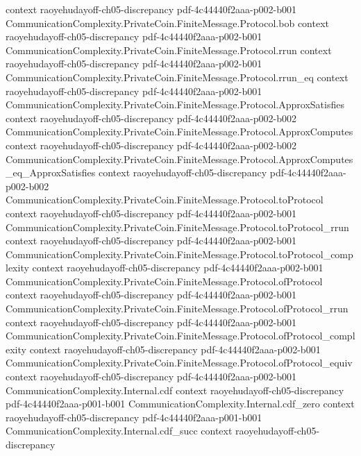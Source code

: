 \begin{theorem}
  {context}
  {raoyehudayoff-ch05-discrepancy}
  {pdf-4c44440f2aaa-p002-b001}
\proofstep
  {CommunicationComplexity.PrivateCoin.FiniteMessage.Protocol.bob}
  {context}
  {raoyehudayoff-ch05-discrepancy}
  {pdf-4c44440f2aaa-p002-b001}
\proofstep
  {CommunicationComplexity.PrivateCoin.FiniteMessage.Protocol.rrun}
  {context}
  {raoyehudayoff-ch05-discrepancy}
  {pdf-4c44440f2aaa-p002-b001}
\proofstep
  {CommunicationComplexity.PrivateCoin.FiniteMessage.Protocol.rrun_eq}
  {context}
  {raoyehudayoff-ch05-discrepancy}
  {pdf-4c44440f2aaa-p002-b001}
\proofstep
  {CommunicationComplexity.PrivateCoin.FiniteMessage.Protocol.ApproxSatisfies}
  {context}
  {raoyehudayoff-ch05-discrepancy}
  {pdf-4c44440f2aaa-p002-b002}
\proofstep
  {CommunicationComplexity.PrivateCoin.FiniteMessage.Protocol.ApproxComputes}
  {context}
  {raoyehudayoff-ch05-discrepancy}
  {pdf-4c44440f2aaa-p002-b002}
\proofstep
  {CommunicationComplexity.PrivateCoin.FiniteMessage.Protocol.ApproxComputes_eq_ApproxSatisfies}
  {context}
  {raoyehudayoff-ch05-discrepancy}
  {pdf-4c44440f2aaa-p002-b002}
\proofstep
  {CommunicationComplexity.PrivateCoin.FiniteMessage.Protocol.toProtocol}
  {context}
  {raoyehudayoff-ch05-discrepancy}
  {pdf-4c44440f2aaa-p002-b001}
\proofstep
  {CommunicationComplexity.PrivateCoin.FiniteMessage.Protocol.toProtocol_rrun}
  {context}
  {raoyehudayoff-ch05-discrepancy}
  {pdf-4c44440f2aaa-p002-b001}
\proofstep
  {CommunicationComplexity.PrivateCoin.FiniteMessage.Protocol.toProtocol_complexity}
  {context}
  {raoyehudayoff-ch05-discrepancy}
  {pdf-4c44440f2aaa-p002-b001}
\proofstep
  {CommunicationComplexity.PrivateCoin.FiniteMessage.Protocol.ofProtocol}
  {context}
  {raoyehudayoff-ch05-discrepancy}
  {pdf-4c44440f2aaa-p002-b001}
\proofstep
  {CommunicationComplexity.PrivateCoin.FiniteMessage.Protocol.ofProtocol_rrun}
  {context}
  {raoyehudayoff-ch05-discrepancy}
  {pdf-4c44440f2aaa-p002-b001}
\proofstep
  {CommunicationComplexity.PrivateCoin.FiniteMessage.Protocol.ofProtocol_complexity}
  {context}
  {raoyehudayoff-ch05-discrepancy}
  {pdf-4c44440f2aaa-p002-b001}
\proofstep
  {CommunicationComplexity.PrivateCoin.FiniteMessage.Protocol.ofProtocol_equiv}
  {context}
  {raoyehudayoff-ch05-discrepancy}
  {pdf-4c44440f2aaa-p002-b001}
\proofstep
  {CommunicationComplexity.Internal.cdf}
  {context}
  {raoyehudayoff-ch05-discrepancy}
  {pdf-4c44440f2aaa-p001-b001}
\proofstep
  {CommunicationComplexity.Internal.cdf_zero}
  {context}
  {raoyehudayoff-ch05-discrepancy}
  {pdf-4c44440f2aaa-p001-b001}
\proofstep
  {CommunicationComplexity.Internal.cdf_succ}
  {context}
  {raoyehudayoff-ch05-discrepancy}

\end{theorem}
